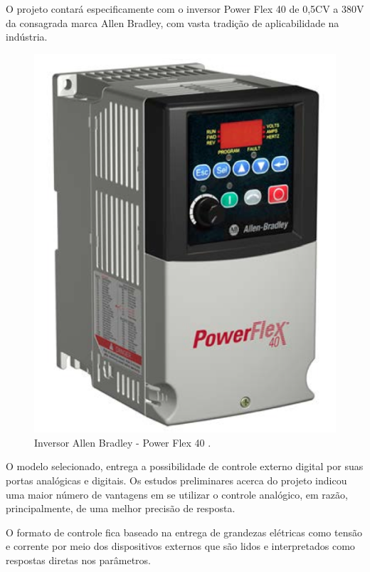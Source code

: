         O projeto contará especificamente com o inversor Power Flex 40 de 0,5CV a 380V da consagrada marca Allen Bradley, com vasta tradição de aplicabilidade na indústria.


\begin{figure}[H]
  \centering
  \label{inversor_final}
  \includegraphics[keepaspectratio=true,scale=0.4]{figuras/inversor_final.png}
  \caption{Inversor Allen Bradley - Power Flex 40 \cite{allen}.}
\end{figure}

        O modelo selecionado, entrega a possibilidade de controle externo digital por suas portas analógicas e digitais. 
        Os estudos preliminares acerca do projeto indicou uma maior número de vantagens em se utilizar o controle analógico, 
        em razão, principalmente, de uma melhor precisão de resposta.

        O formato de controle fica baseado na entrega de grandezas elétricas como tensão e corrente por meio dos dispositivos 
        externos que são lidos e interpretados como respostas diretas nos parâmetros.
        

